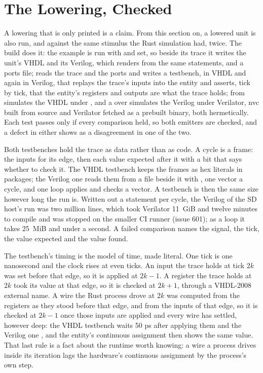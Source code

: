\section{The Lowering, Checked}
\label{sec:x-checked}

A lowering that is only printed is a claim. From this section on, a
lowered unit is also run, and against the same stimulus the Rust
simulation had, twice. The build does it: the example is run with
 and  set, so beside its
trace it writes the unit's VHDL and its Verilog, which
\code{\#[lower]} renders from the same statements, and a ports file;
 reads the trace and the ports and writes a
testbench, in VHDL and again in Verilog, that replays the trace's
inputs into the entity and asserts, tick by tick, that the entity's
registers and outputs are what the trace holds; 
from  simulates the VHDL under , and a
 over  simulates the Verilog
under Verilator, nvc built from source and Verilator fetched as a
prebuilt binary, both hermetically. Each test
passes only if every comparison held, so both emitters are checked,
and a defect in either shows as a disagreement in one of the two.

Both testbenches hold the trace as data rather than as code. A cycle
is a frame: the inputs for its edge, then each value expected after
it with a bit that says whether to check it. The VHDL testbench keeps
the frames as hex literals in packages; the Verilog one reads them
from a file beside it with , one vector a cycle, and
one loop applies and checks a vector. A testbench is then the same
size however long the run is. Written out a statement per cycle, the
Verilog of the SD host's run was two million lines, which took
Verilator 11~GiB and twelve minutes to compile and was stopped on the
smaller CI runner (issue 601); as a loop it takes 25~MiB and under a
second. A failed comparison names the signal, the tick, the value
expected and the value found.

The testbench's timing is the model of time, made literal. One tick is
one nanosecond and the clock rises at even ticks. An input the trace
holds at tick $2k$ was set before that edge, so it is applied at
$2k-1$. A register the trace holds at $2k$ took its value at that
edge, so it is checked at $2k+1$, through a VHDL-2008 external name.
A wire the Rust process drove at $2k$ was computed from the registers
as they stood before that edge, and from the inputs of that edge, so
it is checked at $2k-1$ once those inputs are applied and every wire
has settled, however deep: the VHDL testbench waits 50 ps after
applying them and the Verilog one , and the entity's
continuous assignment then shows the same value. That last rule
is a fact about the runtime worth knowing: a wire a process drives
inside its iteration lags the hardware's continuous assignment by the
process's own step.

